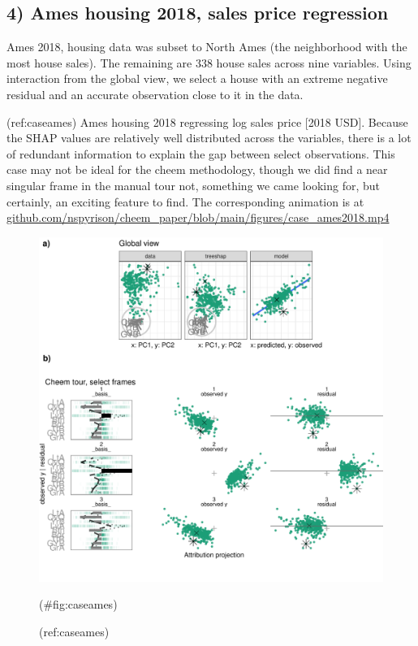 \documentclass[
]{article}
\begin{document}
\hypertarget{ames-housing-2018-sales-price-regression}{%
\subsection{4) Ames housing 2018, sales price
regression}\label{ames-housing-2018-sales-price-regression}}

Ames 2018, housing data was subset to North Ames (the neighborhood with
the most house sales). The remaining are 338 house sales across nine
variables. Using interaction from the global view, we select a house
with an extreme negative residual and an accurate observation close to
it in the data.

(ref:caseames) Ames housing 2018 regressing log sales price {[}2018
USD{]}. Because the SHAP values are relatively well distributed across
the variables, there is a lot of redundant information to explain the
gap between select observations. This case may not be ideal for the
cheem methodology, though we did find a near singular frame in the
manual tour not, something we came looking for, but certainly, an
exciting feature to find. The corresponding animation is at
\href{https://github.com/nspyrison/cheem_paper/blob/main/figures/case_ames2018.mp4}{github.com/nspyrison/cheem\_paper/blob/main/figures/case\_ames2018.mp4}

\begin{figure}

{\centering \includegraphics[width=1\linewidth]{./figures/case_ames2018} 

}

\caption{(ref:caseames)}(\#fig:caseames)
\end{figure}
\end{document}

